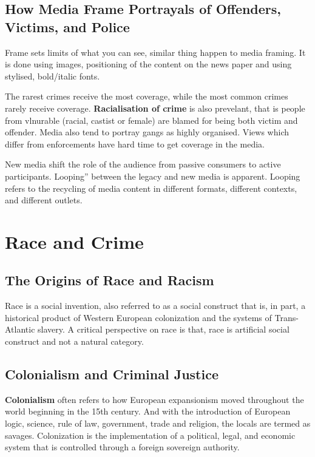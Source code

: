 \documentclass[11pt]{article}
\begin{document}
\subsection{How Media Frame Portrayals of Offenders, Victims, and Police}

Frame sets limits of what you can see, similar thing happen to media framing. It is done using images, positioning of the content on the news paper and using stylised, bold/italic fonts.

The rarest crimes receive the most coverage, while the most common crimes rarely receive coverage. \textbf{Racialisation of crime} is also prevelant, that is people from vlnurable (racial, castist or female) are blamed for being both victim and offender. Media also tend to portray gangs as highly organised. Views which differ from enforcements have hard time to get coverage in the media.

New media shift the role of the audience from passive consumers to active participants. Looping” between the legacy and new media is apparent. Looping refers to the recycling of media content in different formats, different contexts, and different outlets.

\section{Race and Crime}

\subsection{The Origins of Race and Racism}

Race is a social invention, also referred to as a social construct that is, in part, a historical product of Western European colonization and the systems of Trans-Atlantic slavery.
A critical perspective on race is that, race is artificial social construct and not a natural category.

\subsection{Colonialism and Criminal Justice}

\textbf{Colonialism} often refers to how European expansionism moved throughout the world beginning in the 15th century. And with the introduction of European logic, science, rule of law, government, trade and religion, the locals are termed as savages. Colonization is the implementation of a political, legal, and economic system that is controlled through a foreign sovereign authority.
\end{document}
